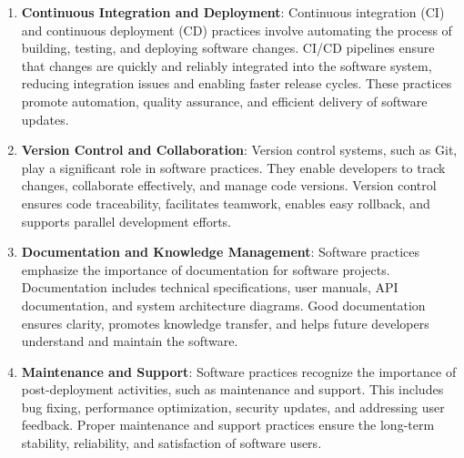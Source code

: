 \begin{enumerate}
    \item \textbf{Continuous Integration and Deployment}: Continuous integration (CI) and continuous deployment (CD) practices involve automating the process of building, testing, and deploying software changes. CI/CD pipelines ensure that changes are quickly and reliably integrated into the software system, reducing integration issues and enabling faster release cycles. These practices promote automation, quality assurance, and efficient delivery of software updates.

    \item \textbf{Version Control and Collaboration}: Version control systems, such as Git, play a significant role in software practices. They enable developers to track changes, collaborate effectively, and manage code versions. Version control ensures code traceability, facilitates teamwork, enables easy rollback, and supports parallel development efforts.

    \item \textbf{Documentation and Knowledge Management}: Software practices emphasize the importance of documentation for software projects. Documentation includes technical specifications, user manuals, API documentation, and system architecture diagrams. Good documentation ensures clarity, promotes knowledge transfer, and helps future developers understand and maintain the software.

    \item \textbf{Maintenance and Support}: Software practices recognize the importance of post-deployment activities, such as maintenance and support. This includes bug fixing, performance optimization, security updates, and addressing user feedback. Proper maintenance and support practices ensure the long-term stability, reliability, and satisfaction of software users.
\end{enumerate}

